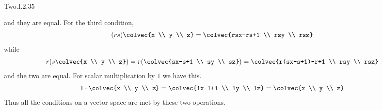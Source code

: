 \begin{ans}{Two.I.2.35}
\begin{exparts}
\begin{equation*}
           \end{equation*}
           and they are equal.
           For the third condition,
           \begin{equation*}
             (rs)\colvec{x \\ y \\ z}
             =\colvec{rsx-rs+1 \\ rsy \\ rsz}
           \end{equation*}
           while
           \begin{equation*}
             r(s\colvec{x \\ y \\ z})
             =r(\colvec{sx-s+1 \\ sy \\ sz})
             =\colvec{r(sx-s+1)-r+1 \\ rsy \\ rsz}
           \end{equation*}
           and the two are equal.
           For scalar multiplication by $1$ we have this.
           \begin{equation*}
             1\cdot\colvec{x \\ y \\ z}
             =\colvec{1x-1+1 \\ 1y \\ 1z}
             =\colvec{x \\ y \\ z}
           \end{equation*}
           Thus all the conditions on a vector space are met by these two
           operations.


\end{exparts}
\end{ans}
